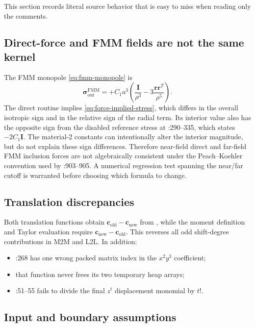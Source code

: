 \documentclass[11pt]{article}
\newcommand{\vect}[1]{\bm{#1}}
\newcommand{\code}[1]{\texttt{\detokenize{#1}}}
\begin{document}
This section records literal source behavior that is easy to miss when reading
only the comments.

\subsection{Direct-force and FMM fields are not the same kernel}

The FMM monopole \eqref{eq:fmm-monopole} is
\[
\vect{\sigma}_{\mathrm{out}}^{\mathrm{FMM}}
=+C_1a^3\left(\frac{\vect{I}}{\rho^3}
              -3\frac{\vect{r}\vect{r}^T}{\rho^5}\right).
\]
The direct routine implies \eqref{eq:force-implied-stress}, which differs in
the overall isotropic sign and in the relative sign of the radial term.  Its
interior value also has the opposite sign from the disabled reference stress
at :290--335, which states
\(-2C_1\vect{I}\).  The material-2 constants can intentionally alter the
interior magnitude, but do not explain these sign differences.  Therefore
near-field direct and far-field FMM inclusion forces are not algebraically
consistent under the Peach--Koehler convention used by
:903--905.  A numerical regression test spanning
the near/far cutoff is warranted before choosing which formula to change.

\subsection{Translation discrepancies}

Both translation functions obtain
\(\vect{c}_{\mathrm{old}}-\vect{c}_{\mathrm{new}}\) from
\code{EshelbyMakeEta}, while the moment definition and Taylor evaluation
require \(\vect{c}_{\mathrm{new}}-\vect{c}_{\mathrm{old}}\).  This reverses
all odd shift-degree contributions in M2M and L2L.  In addition:
\begin{itemize}
\item {}:268 has one wrong packed matrix index
  in the \(x^2y^3\) coefficient;
\item that function never frees its two temporary heap arrays;
\item {}:51--55 fails to divide the final
  \(z^t\) displacement monomial by \(t!\).
\end{itemize}

\subsection{Input and boundary assumptions}
\end{document}
